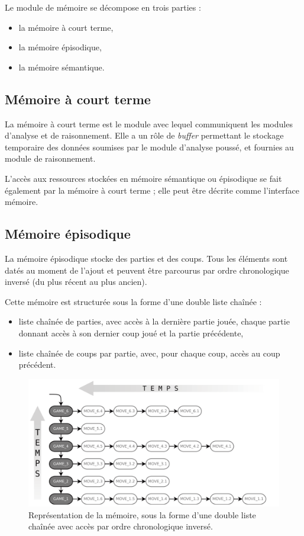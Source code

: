 Le module de mémoire se décompose en trois parties :
\begin{itemize}
\item la mémoire à court terme,
\item la mémoire épisodique,
\item la mémoire sémantique.
\end{itemize}

\subsection{Mémoire à court terme}

La mémoire à court terme est le module avec lequel communiquent les modules d'analyse et de raisonnement. Elle a un rôle de \emph{buffer} permettant le stockage temporaire des données soumises par le module d'analyse poussé, et fournies au module de raisonnement.

L'accès aux ressources stockées en mémoire sémantique ou épisodique se fait également par la mémoire à court terme ; elle peut être décrite comme l'interface mémoire.

\subsection{Mémoire épisodique}
\label{conception_memoire_episodique}

La mémoire épisodique stocke des parties et des coups. Tous les éléments sont datés au moment de l'ajout et peuvent être parcourus par ordre chronologique inversé (du plus récent au plus ancien).

Cette mémoire est structurée sous la forme d'une double liste chaînée :
\begin{itemize}
\item liste chaînée de parties, avec accès à la dernière partie jouée, chaque partie donnant accès à son dernier coup joué et la partie précédente,
\item liste chaînée de coups par partie, avec, pour chaque coup, accès au coup précédent.
\end{itemize}

\begin{figure}[H]
\includegraphics[width=\textwidth]{files/memoire/episodic_general}
\caption{Représentation de la mémoire, sous la forme d'une double liste chaînée avec accès par ordre chronologique inversé.}
\end{figure}

